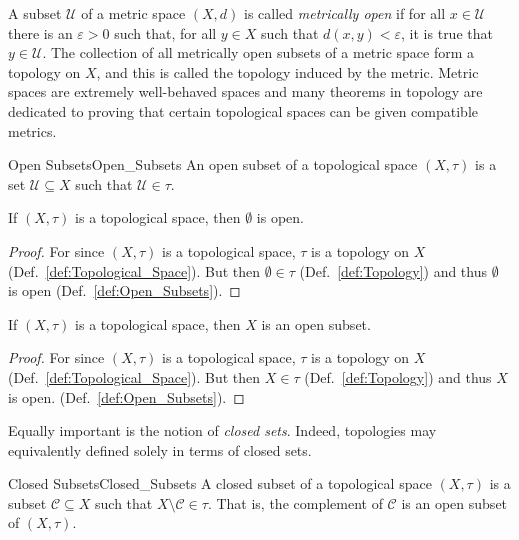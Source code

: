     A subset $\mathcal{U}$ of a metric space $(X,d)$ is called
    \textit{metrically open} if for all $x\in\mathcal{U}$ there is an
    $\varepsilon>0$ such that, for all $y\in{X}$ such that $d(x,y)<\varepsilon$,
    it is true that $y\in\mathcal{U}$. The collection of all metrically open
    subsets of a metric space form a topology on $X$, and this is called the
    topology induced by the metric. Metric
    spaces are extremely well-behaved spaces and many theorems in topology are
    dedicated to proving that certain topological spaces can be given
    compatible metrics.
    \begin{fdefinition}{Open Subsets}{Open_Subsets}
        An open subset of a \gls{topological space} $(X,\tau)$ is a \gls{set}
        $\mathcal{U}\subseteq{X}$ such that $\mathcal{U}\in\tau$.
    \end{fdefinition}
    \begin{theorem}
        \label{thm:Emptyset_Is_Open}%
        If $(X,\tau)$ is a topological space, then $\emptyset$ is open.
    \end{theorem}
    \begin{proof}
        For since $(X,\tau)$ is a topological space, $\tau$ is a topology on $X$
        (Def.~\ref{def:Topological_Space}). But then $\emptyset\in\tau$
        (Def.~\ref{def:Topology}) and thus $\emptyset$ is open
        (Def.~\ref{def:Open_Subsets}).
    \end{proof}
    \begin{theorem}
        \label{thm:Whole_Space_Is_Open}%
        If $(X,\tau)$ is a topological space, then $X$ is an open subset.
    \end{theorem}
    \begin{proof}
        For since $(X,\tau)$ is a topological space, $\tau$ is a topology on $X$
        (Def.~\ref{def:Topological_Space}). But then
        $X\in\tau$ (Def.~\ref{def:Topology}) and thus $X$ is open.
        (Def.~\ref{def:Open_Subsets}).
    \end{proof}
    Equally important is the notion of \textit{closed sets}. Indeed, topologies
    may equivalently defined solely in terms of closed sets.
    \begin{fdefinition}{Closed Subsets}{Closed_Subsets}
        A closed subset of a \gls{topological space} $(X,\tau)$ is a
        \gls{subset} $\mathcal{C}\subseteq{X}$ such that
        $X\setminus\mathcal{C}\in\tau$. That is, the complement of $\mathcal{C}$
        is an open subset of $(X,\tau)$.
    \end{fdefinition}
